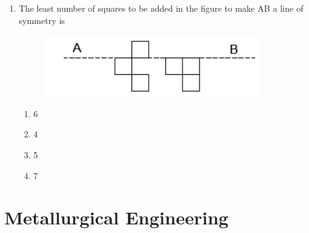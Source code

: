 \documentclass[journal]{IEEEtran}
\theoremstyle{remark}
\begin{document}
\begin{enumerate}[resume]
\item The least number of squares to be added in the figure to make AB a line of symmetry is \hfill{}
\begin{figure}[H]
    \centering
    \includegraphics[width=0.4\columnwidth]{figs/Q.10.png}
    \caption{}
    \label{fig:placeholder}
\end{figure}
\begin{multicols}{4}
\begin{enumerate}
\item 6
\item 4
\item 5
\item 7
\end{enumerate}
\end{multicols}
\end{enumerate}

\section*{Metallurgical Engineering}
\end{document}
